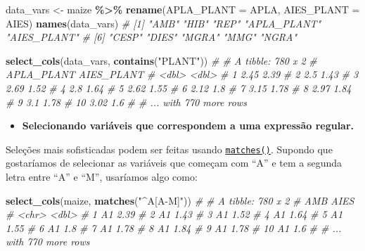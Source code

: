 \documentclass[
]{book}
\makeatletter
\newenvironment{Shaded}{\begin{snugshade}}{\end{snugshade}}
\newcommand{\CommentTok}[1]{\textcolor[rgb]{0.56,0.35,0.01}{\textit{#1}}}
\newcommand{\DataTypeTok}[1]{\textcolor[rgb]{0.13,0.29,0.53}{#1}}
\newcommand{\KeywordTok}[1]{\textcolor[rgb]{0.13,0.29,0.53}{\textbf{#1}}}
\newcommand{\NormalTok}[1]{#1}
\newcommand{\OperatorTok}[1]{\textcolor[rgb]{0.81,0.36,0.00}{\textbf{#1}}}
\newcommand{\StringTok}[1]{\textcolor[rgb]{0.31,0.60,0.02}{#1}}
\providecommand{\tightlist}{%
  \setlength{\itemsep}{0pt}\setlength{\parskip}{0pt}}
\numberwithin{equation}{section}
\newcommand{\indf}[1]{\index[function]{#1@\texttt{#1()}|ST}}
\makeatother
\begin{document}
\begin{Shaded}
\begin{Highlighting}[]
\NormalTok{data\_vars \textless{}{-}}\StringTok{ }
\StringTok{  }\NormalTok{maize }\OperatorTok{\%\textgreater{}\%}
\StringTok{  }\KeywordTok{rename}\NormalTok{(}\DataTypeTok{APLA\_PLANT =}\NormalTok{ APLA,}
         \DataTypeTok{AIES\_PLANT =}\NormalTok{ AIES)}
\KeywordTok{names}\NormalTok{(data\_vars)}
\CommentTok{\#  [1] "AMB"        "HIB"        "REP"        "APLA\_PLANT" "AIES\_PLANT"}
\CommentTok{\#  [6] "CESP"       "DIES"       "MGRA"       "MMG"        "NGRA"}

\KeywordTok{select\_cols}\NormalTok{(data\_vars, }\KeywordTok{contains}\NormalTok{(}\StringTok{"PLANT"}\NormalTok{))}
\CommentTok{\# \# A tibble: 780 x 2}
\CommentTok{\#    APLA\_PLANT AIES\_PLANT}
\CommentTok{\#         \textless{}dbl\textgreater{}      \textless{}dbl\textgreater{}}
\CommentTok{\#  1       2.45       2.39}
\CommentTok{\#  2       2.5        1.43}
\CommentTok{\#  3       2.69       1.52}
\CommentTok{\#  4       2.8        1.64}
\CommentTok{\#  5       2.62       1.55}
\CommentTok{\#  6       2.12       1.8 }
\CommentTok{\#  7       3.15       1.78}
\CommentTok{\#  8       2.97       1.84}
\CommentTok{\#  9       3.1        1.78}
\CommentTok{\# 10       3.02       1.6 }
\CommentTok{\# \# ... with 770 more rows}
\end{Highlighting}
\end{Shaded}

\begin{itemize}
\tightlist
\item
  \textbf{Selecionando variáveis que correspondem a uma expressão regular.}
\end{itemize}

Seleções mais sofisticadas podem ser feitas usando \href{https://tidyselect.r-lib.org/reference/select_helpers.html}{\texttt{matches()}}. Supondo que gostaríamos de selecionar as variáveis que começam com ``A'' e tem a segunda letra entre ``A'' e ``M'', usaríamos algo como:\indf{matches}

\begin{Shaded}
\begin{Highlighting}[]
\KeywordTok{select\_cols}\NormalTok{(maize, }\KeywordTok{matches}\NormalTok{(}\StringTok{"\^{}A[A{-}M]"}\NormalTok{))}
\CommentTok{\# \# A tibble: 780 x 2}
\CommentTok{\#    AMB    AIES}
\CommentTok{\#    \textless{}chr\textgreater{} \textless{}dbl\textgreater{}}
\CommentTok{\#  1 A1     2.39}
\CommentTok{\#  2 A1     1.43}
\CommentTok{\#  3 A1     1.52}
\CommentTok{\#  4 A1     1.64}
\CommentTok{\#  5 A1     1.55}
\CommentTok{\#  6 A1     1.8 }
\CommentTok{\#  7 A1     1.78}
\CommentTok{\#  8 A1     1.84}
\CommentTok{\#  9 A1     1.78}
\CommentTok{\# 10 A1     1.6 }
\CommentTok{\# \# ... with 770 more rows}
\end{Highlighting}
\end{Shaded}
\end{document}

